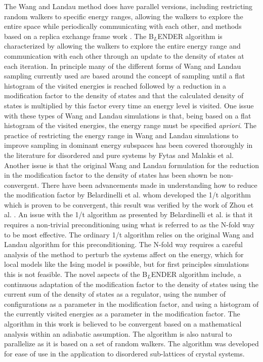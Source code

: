 \documentclass[aps,pre,reprint,superscriptaddress,showkeys]{revtex4-2}
\begin{document}
    The Wang and Landau method does have parallel versions, including  restricting random walkers to specific energy ranges, allowing the walkers to explore the entire space while periodically communicating with each other, and methods based on a replica exchange frame work \cite{MP_Wang_Landau,P_imp_Wang_Landau, Hframe_Wang_Landau, Scalable_replica_exchange}.  The B$_{L}$ENDER algorithm is characterized by allowing the walkers to explore the entire energy range and communication with each other through an update to the density of states at each iteration.  In principle many of the different forms of  Wang and Landau sampling currently used are based around the concept of sampling until a flat histogram of the visited energies is reached followed by a reduction in a modification factor to the density of states and that the calculated density of states  is multiplied by this factor every time an energy level  is visited.  One issue with these types of Wang and Landau simulations is that, being based on a flat histogram of the visited energies, the energy range must be specified \textit{apriori}. The practice of restricting the energy range in Wang and Landau simulations to improve sampling in dominant energy subspaces has been covered thoroughly in the literature for disordered and pure systems by Fytas and Malakis et al.  \cite{criticalbehavior,domensubspaces,specificheat3dising,criticalbehavior2dising,dominantenergysubspace3ising,QuenchedBond2dising} Another issue is that the original Wang and Landau formulation for the reduction in the modification factor to the  density of states has been shown be non-convergent\cite{Non_convergent_WL,Non_convergent_WL_2,non_convergence_multiple_random_walkers,Optimal_modification}.   There have been advancements made in understanding how to reduce the modification factor by Belardinelli et al. \cite{saturation} whom developed the 1/t algorithm which is proven to be convergent, this result was verified by the work of Zhou et al. \cite{Optimal_modification}. An issue with the 1/t algorithm as presented by Belardinelli et al. is that it requires a non-trivial preconditioning using what is referred to as the N-fold way to be most effective. The ordinary 1/t algorithm relies on the original Wang and Landau algorithm for this preconditioning. The N-fold way requires a careful analysis of the  method to perturb the systems affect on the energy, which for local models like the Ising model is possible, but for first principles simulations this is not feasible. The novel aspects of the B$_{L}$ENDER algorithm include, a continuous adaptation of the modification factor to the  density of states using the current sum of the density of states as a regulator, using the number of configurations as a parameter in the modification factor, and using a histogram of the currently visited energies as a parameter in the modification factor.  The algorithm in this work is believed to be convergent based on a mathematical analysis within an adiabatic assumption. The algorithm is also natural to parallelize as it is based on a set of random walkers. The algorithm was developed for ease of use in the application to disordered sub-lattices of crystal systems. 
\end{document}
